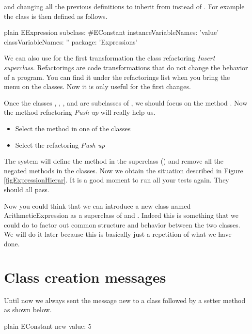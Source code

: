 \documentclass[10pt,twoside,english]{_support/latex/sbabook/sbabook}
\begin{document}
and changing all the previous definitions to inherit from  instead of .
For example the class  is then defined as follows. 

\begin{displaycode}{plain}
EExpression subclass: #EConstant
	instanceVariableNames: 'value'
	classVariableNames: ''
	package: 'Expressions'
\end{displaycode}

We can also use for the first transformation the class refactoring \textit{Insert superclass}. Refactorings are code transformations that do not change the behavior of a program. You can find it under the refactorings list when you bring the menu on the classes. 
Now it is only useful for the first changes. 

Once the classes , , , and  are subclasses of , we should focus on the method . Now the method refactoring \textit{Push up} will really help us. 

\begin{itemize}
\item Select the method  in one of the classes
\item Select the refactoring \textit{Push up}
\end{itemize}

The system will define the method  in the superclass () and remove all the negated methods in the classes. Now we obtain the situation described in Figure \ref{figExpressionHierar}. It is a good moment to run all your tests again. They should all pass. 

Now you could think that we can introduce a new class named ArithmeticExpression as a superclass of  and . Indeed this is something that we could do to factor out common structure and behavior between the two classes. We will do it later because this is basically just a repetition of what we have done.
\section{Class creation messages}
Until now we always sent the message new to a class followed by a setter method as shown below. 

\begin{displaycode}{plain}
EConstant new value: 5
\end{displaycode}
\end{document}
